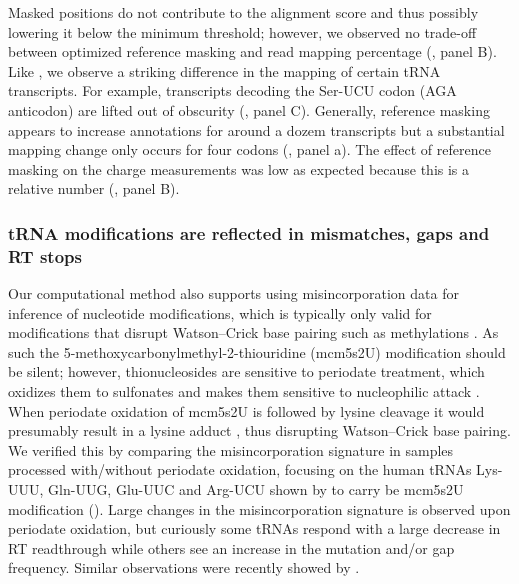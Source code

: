 \documentclass[9pt,lineno]{elife}
\begin{document}
Masked positions do not contribute to the alignment score and thus possibly lowering it below the minimum threshold; however, we observed no trade-off between optimized reference masking and read mapping percentage (, panel B).
Like \cite{Behrens2021-gb}, we observe a striking difference in the mapping of certain tRNA transcripts.
For example, transcripts decoding the Ser-UCU codon (AGA anticodon) are lifted out of obscurity (, panel C).
Generally, reference masking appears to increase annotations for around a dozem transcripts but a substantial mapping change only occurs for four codons (, panel a).
The effect of reference masking on the charge measurements was low as expected because this is a relative number (, panel B).





\subsubsection{tRNA modifications are reflected in mismatches, gaps and RT stops}
Our computational method also supports using misincorporation data for inference of nucleotide modifications, which is typically only valid for modifications that disrupt Watson–Crick base pairing such as methylations \citep{Clark2016-ph, Behrens2021-gb}.
As such the 5-methoxycarbonylmethyl-2-thiouridine (mcm5s2U) modification should be silent; however, thionucleosides are sensitive to periodate treatment, which oxidizes them to sulfonates and makes them sensitive to nucleophilic attack \citep{Ziff1968-la, Rao1974-zq}.
When periodate oxidation of mcm5s2U is followed by lysine cleavage it would presumably result in a lysine adduct \citep{Ziff1968-la}, thus disrupting Watson–Crick base pairing.
We verified this by comparing the misincorporation signature in samples processed with/without periodate oxidation, focusing on the human tRNAs Lys-UUU, Gln-UUG, Glu-UUC and Arg-UCU shown by \cite{Lentini2018-xs} to carry be mcm5s2U modification ().
Large changes in the misincorporation signature is observed upon periodate oxidation, but curiously some tRNAs respond with a large decrease in RT readthrough while others see an increase in the mutation and/or gap frequency.
Similar observations were recently showed by \cite{Katanski2022-ij}.
\end{document}
